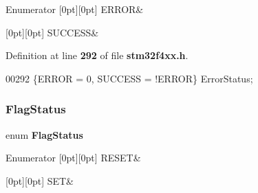 \begin{DoxyEnumFields}{Enumerator}
[0pt][0pt]{}\mbox{\label{group__Exported__types_gga8333b96c67f83cba354b3407fcbb6ee8a2fd6f336d08340583bd620a7f5694c90}} 
E\+R\+R\+OR&\\
\hline

[0pt][0pt]{}\mbox{\label{group__Exported__types_gga8333b96c67f83cba354b3407fcbb6ee8ac7f69f7c9e5aea9b8f54cf02870e2bf8}} 
S\+U\+C\+C\+E\+SS&\\
\hline

\end{DoxyEnumFields}


Definition at line \textbf{ 292} of file \textbf{ stm32f4xx.\+h}.


\begin{DoxyCode}
00292 \{ERROR = 0, SUCCESS = !ERROR\} ErrorStatus;
\end{DoxyCode}
\mbox{\label{group__Exported__types_ga89136caac2e14c55151f527ac02daaff}} 
\subsubsection{Flag\+Status}
{\footnotesize\ttfamily enum \textbf{ Flag\+Status}}

\begin{DoxyEnumFields}{Enumerator}
[0pt][0pt]{}\mbox{\label{group__Exported__types_gga89136caac2e14c55151f527ac02daaffa589b7d94a3d91d145720e2fed0eb3a05}} 
R\+E\+S\+ET&\\
\hline

[0pt][0pt]{}\mbox{\label{group__Exported__types_gga89136caac2e14c55151f527ac02daaffab44c8101cc294c074709ec1b14211792}} 
S\+ET&\\
\hline

\end{DoxyEnumFields}


